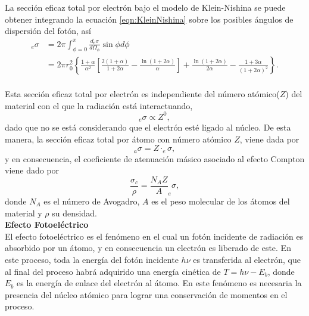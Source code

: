 La sección eficaz total por electrón bajo el modelo de Klein-Nishina se puede obtener integrando la ecuación \eqref{eqn:KleinNishina} sobre los posibles ángulos de dispersión del fotón, así
\begin{equation}
\begin{split}
_{e}\sigma&=2 \pi \int_{\phi=0}^{\pi} \frac{d_{e} \sigma}{d \Omega_{\phi}} \sin \phi d \phi\\
&=2 \pi r_{0}^{2}\left\{\frac{1+\alpha}{\alpha^{2}}\left[\frac{2(1+\alpha)}{1+2 \alpha}-\frac{\ln (1+2 \alpha)}{\alpha}\right]+\frac{\ln (1+2 \alpha)}{2 \alpha}-\frac{1+3 \alpha}{(1+2 \alpha)^{2}}\right\}.
\end{split}
\end{equation}
\\

Esta sección eficaz total por electrón es independiente del número atómico($Z$) del material con el que la radiación está interactuando,
\begin{equation}
	_{e}\sigma\propto Z^0,
\end{equation}
dado que no se está considerando que el electrón esté ligado al núcleo. De esta manera, la sección eficaz total por átomo con número atómico $Z$, viene dada por 
\begin{equation}
	_{a}\sigma=Z\cdot _{e}\sigma,
\end{equation}
y en consecuencia, el coeficiente de atenuación másico asociado al efecto Compton viene dado por 
\begin{equation}
	\frac{\sigma_c}{\rho}=\frac{N_{A}Z}{A}  _{e}\sigma,
\end{equation} 
donde $N_A$ es el número de Avogadro, $A$ es el peso molecular de los átomos del material y $\rho$ su densidad.\\

\textbf{Efecto Fotoeléctrico}\\

El efecto fotoeléctrico es el fenómeno en el cual un fotón incidente de radiación es absorbido por un átomo, y en consecuencia un electrón es liberado de este. En este proceso, toda la energía del fotón incidente $h\nu$ es transferida al electrón, que al final del proceso habrá adquirido una energía cinética de $T=h\nu-E_b$, donde $E_b$ es la energía de enlace del electrón al átomo. En este fenómeno es necesaria la presencia del núcleo atómico para lograr una conservación de momentos en el proceso. \\

